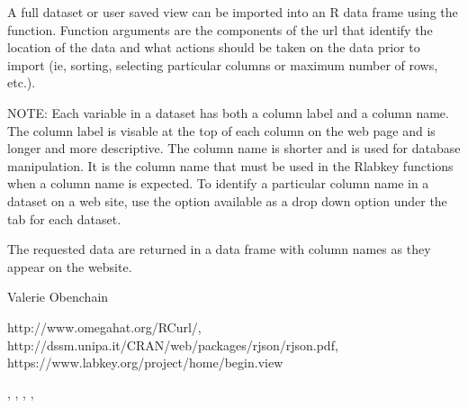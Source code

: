 \documentclass{article}
\begin{document}
\begin{Details}\relax
A full dataset or user saved view can be imported into an R data frame using the 
 function. Function arguments are the components of the url that identify
the location of the data and what actions should be taken on the data prior to import
(ie, sorting, selecting particular columns or maximum number of rows, etc.).

NOTE: Each variable in a dataset has both a column label and a column name. The column label is visable at the top
of each column on the web page and is longer and more descriptive. The column name is shorter and is
used  for database manipulation. It is the column name that must be used in
the Rlabkey functions when a column name is expected. To identify a particular column name in a dataset on
a web site, use the  option available as a drop down option under the 
tab for each dataset.
\end{Details}
\begin{Value}
The requested data are returned in a data frame with column names as they appear on the website.
\end{Value}
\begin{Author}\relax
Valerie Obenchain
\end{Author}
\begin{References}\relax
http://www.omegahat.org/RCurl/,\\ 
http://dssm.unipa.it/CRAN/web/packages/rjson/rjson.pdf,\\
https://www.labkey.org/project/home/begin.view
\end{References}
\begin{SeeAlso}\relax
{}, , , 
, 
\end{SeeAlso}
\end{document}
